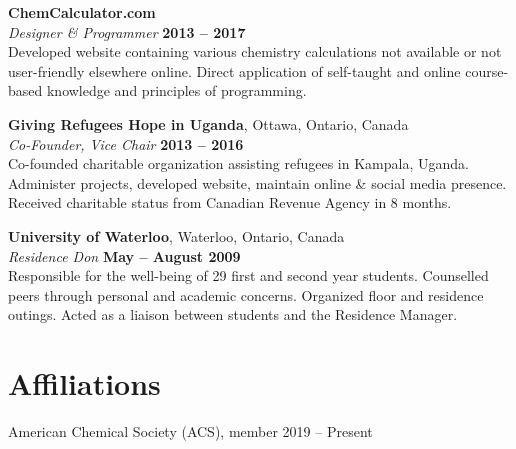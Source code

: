 \documentclass[margin,line]{resumecls}
\begin{document}
\begin{resume}
    \textbf{ChemCalculator.com}\\\vspace{1mm}%
    \textsl{Designer \& Programmer} \hfill \textbf{2013 -- 2017}\\
    Developed website containing various chemistry calculations not available or not user-friendly elsewhere online.
    Direct application of self-taught and online course-based knowledge and principles of programming.

    \textbf{Giving Refugees Hope in Uganda}, Ottawa, Ontario, Canada\\\vspace{1mm}%
    \textsl{Co-Founder, Vice Chair} \hfill \textbf{2013 -- 2016}\\
    Co-founded charitable organization assisting refugees in Kampala, Uganda.
    Administer projects, developed website, maintain online \& social media presence.
    Received charitable status from Canadian Revenue Agency in 8 months.

    \textbf{University of Waterloo}, Waterloo, Ontario, Canada\\\vspace{1mm}%
    \textsl{Residence Don} \hfill \textbf{May -- August 2009}\\
    Responsible for the well-being of 29 first and second year students.
    Counselled peers through personal and academic concerns.
    Organized floor and residence outings.
    Acted as a liaison between students and the Residence Manager.


\vspace{1mm}
    \section{\mysidestyle Affiliations}\label{sec:mysidestyle-affiliations}

    American Chemical Society (ACS), member 2019 -- Present

\end{resume}
\end{document}
